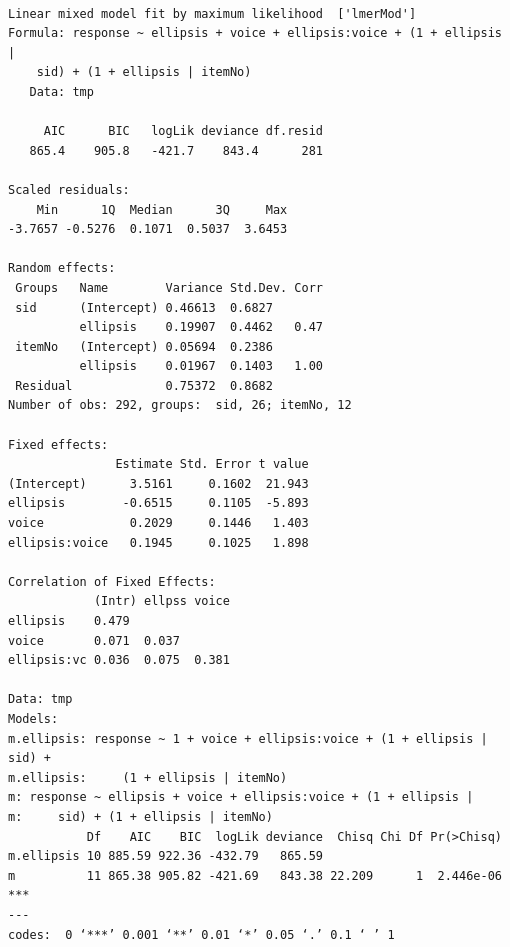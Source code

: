 \documentclass[11pt]{article}
\begin{document}
\begin{verbatim}

Linear mixed model fit by maximum likelihood  ['lmerMod']
Formula: response ~ ellipsis + voice + ellipsis:voice + (1 + ellipsis |  
    sid) + (1 + ellipsis | itemNo)
   Data: tmp

     AIC      BIC   logLik deviance df.resid 
   865.4    905.8   -421.7    843.4      281 

Scaled residuals: 
    Min      1Q  Median      3Q     Max 
-3.7657 -0.5276  0.1071  0.5037  3.6453 

Random effects:
 Groups   Name        Variance Std.Dev. Corr
 sid      (Intercept) 0.46613  0.6827       
          ellipsis    0.19907  0.4462   0.47
 itemNo   (Intercept) 0.05694  0.2386       
          ellipsis    0.01967  0.1403   1.00
 Residual             0.75372  0.8682       
Number of obs: 292, groups:  sid, 26; itemNo, 12

Fixed effects:
               Estimate Std. Error t value
(Intercept)      3.5161     0.1602  21.943
ellipsis        -0.6515     0.1105  -5.893
voice            0.2029     0.1446   1.403
ellipsis:voice   0.1945     0.1025   1.898

Correlation of Fixed Effects:
            (Intr) ellpss voice
ellipsis    0.479              
voice       0.071  0.037       
ellipsis:vc 0.036  0.075  0.381

Data: tmp
Models:
m.ellipsis: response ~ 1 + voice + ellipsis:voice + (1 + ellipsis | sid) + 
m.ellipsis:     (1 + ellipsis | itemNo)
m: response ~ ellipsis + voice + ellipsis:voice + (1 + ellipsis | 
m:     sid) + (1 + ellipsis | itemNo)
           Df    AIC    BIC  logLik deviance  Chisq Chi Df Pr(>Chisq)    
m.ellipsis 10 885.59 922.36 -432.79   865.59                             
m          11 865.38 905.82 -421.69   843.38 22.209      1  2.446e-06 ***
---
codes:  0 ‘***’ 0.001 ‘**’ 0.01 ‘*’ 0.05 ‘.’ 0.1 ‘ ’ 1
\end{verbatim}
\end{document}
